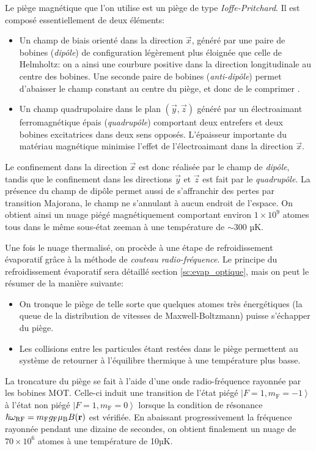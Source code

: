 Le piège magnétique que l'on utilise est un piège de type \emph{Ioffe-Pritchard}. Il est composé essentiellement de deux éléments:
\begin{itemize}
\item[\textendash] Un champ de biais orienté dans la direction $\vec{x}$, généré par une paire de bobines (\emph{dipôle}) de configuration légèrement plus éloignée que celle de Helmholtz: on a ainsi une courbure positive dans la direction longitudinale au centre des bobines. Une seconde paire de bobines (\emph{anti-dipôle}) permet d'abaisser le champ constant au centre du piège, et donc de le comprimer \citep{fauquembergue2004realisation}.
\item[\textendash] Un champ quadrupolaire dans le plan $(\vec{y},\vec{z})$ généré par un électroaimant ferromagnétique épais (\emph{quadrupôle}) comportant deux entrefers et deux bobines excitatrices dans deux sens opposés. L'épaisseur importante du matériau magnétique minimise l'effet de l'électroaimant dans la direction $\vec{x}$.
\end{itemize}
Le confinement dans la direction $\vec{x}$ est donc réalisée par le champ de \emph{dipôle}, tandis que le confinement dans les directions $\vec{y}$ et $\vec{z}$ est fait par le \emph{quadrupôle}. 
La présence du champ de dipôle permet aussi de s'affranchir des pertes par transition Majorana, le champ ne s'annulant à aucun endroit de l'espace.
On obtient ainsi un nuage piégé magnétiquement comportant environ $1 \times 10^9$ atomes tous dans le même sous-état zeeman à une température de $\sim 300$ µK.

Une fois le nuage thermalisé, on procède à une étape de refroidissement évaporatif grâce à la méthode de \emph{couteau radio-fréquence}. Le principe du refroidissement évaporatif sera détaillé section \ref{sc:evap_optique}, mais on peut le résumer de la manière suivante:
\begin{itemize}
\item[\textendash]On tronque le piège de telle sorte que quelques atomes très énergétiques (la queue de la distribution de vitesses de Maxwell-Boltzmann) puisse s'échapper du piège.
\item[\textendash]Les collisions entre les particules étant restées dans le piège permettent au système de retourner à l'équilibre thermique à une température plus basse.
\end{itemize}
La troncature du piège se fait à l'aide d'une onde radio-fréquence rayonnée par les bobines MOT. Celle-ci induit une transition de l'état piégé $\left| F=1, m_{\mathrm{F}}=-1 \right\rangle$ à l'état non piégé $\left| F=1, m_{\mathrm{F}}=0 \right\rangle$ lorsque la condition de résonance $\hslash \omega_{\mathrm{RF}} = m_{\mathrm{F}} g_{\mathrm{F}} \mu_{\mathrm{B}} B(\mathbf{r})$ est vérifiée. En abaissant progressivement la fréquence rayonnée pendant une dizaine de secondes, on obtient finalement un nuage de $70 \times 10^6$ atomes à une température de 10µK.

